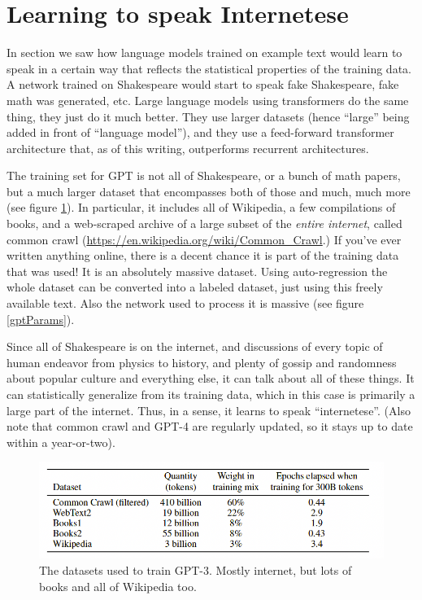 \section{Learning to speak Internetese}

In section  we saw how language models trained on example text would learn to speak in a certain way that reflects the statistical properties of the training data. A network trained on Shakespeare would start to speak fake Shakespeare, fake math was generated, etc. 
Large language models using transformers do the same thing, they just do it much better. They use larger datasets (hence ``large'' being added in front of ``language model''), and they use a feed-forward transformer architecture that, as of this writing, outperforms recurrent architectures. 

The training set for GPT is not all of Shakespeare, or a bunch of math papers, but a much larger dataset that encompasses both of those and much, much more (see figure \ref{gptDatasets}).  In particular, it includes all of Wikipedia, a few compilations of books, and a web-scraped archive of a large subset of the \emph{entire internet}, called common crawl (\url{https://en.wikipedia.org/wiki/Common_Crawl}.) If you've ever written anything online, there is a decent chance it is part of the training data that was used! It is an absolutely massive dataset. Using auto-regression the whole dataset can be converted into a labeled dataset, just using this freely available text.  Also the network used to process it is massive (see figure \ref{gptParams}). 

Since all of Shakespeare is on the internet, and discussions of every topic of human endeavor from physics to history, and plenty of gossip and randomness about popular culture and everything else, it can talk about all of these things.  It can statistically generalize from its training data, which in this case is primarily a large part of the internet. Thus, in a sense, it learns to speak ``internetese''.  (Also note that common crawl and GPT-4 are regularly updated, so it stays up to date within a year-or-two). 

\begin{figure}[h]
\centering
\includegraphics[scale=.4]{./images/gptDatasets}
\caption[GPT Technical report. Todo]{The datasets used to train GPT-3. Mostly internet, but lots of books and all of Wikipedia too. }
\label{gptDatasets}
\end{figure}

